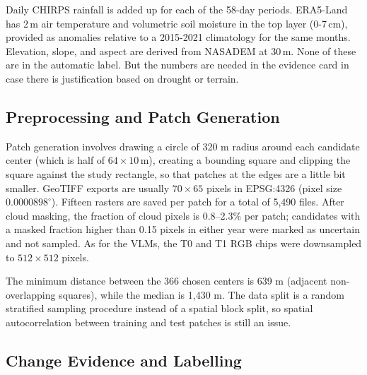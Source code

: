 Daily CHIRPS rainfall is added up for each of the 58-day periods.
ERA5-Land has 2\,m air temperature and volumetric soil moisture in the
top layer (0-7\,cm), provided as anomalies relative to a 2015-2021
climatology for the same months. Elevation, slope, and aspect are derived from NASADEM at 30\,m. None
of these are in the automatic label. But the numbers are needed in
the evidence card in case there is justification based on drought or
terrain.

\subsection{Preprocessing and Patch Generation}

Patch generation involves drawing a circle of 320 m radius
around each candidate center (which is half of $64 \times 10$\,m),
creating a bounding square and clipping the square against the
study rectangle, so that patches at the edges are a little bit smaller.
GeoTIFF exports are usually $70 \times 65$ pixels in EPSG:4326 (pixel size $0.0000898^\circ$).
Fifteen rasters are saved per patch for a total of 5,490 files. After cloud masking, the fraction of cloud pixels is 0.8--2.3\%
per patch; candidates with a masked fraction higher than 0.15
pixels in either year were marked as uncertain and not sampled. As
for the VLMs, the T0 and T1 RGB chips were downsampled to
$512 \times 512$ pixels.

The minimum distance between the 366 chosen centers is 639 m
(adjacent non-overlapping squares), while the median is 1,430 m.
The data split is a random stratified sampling procedure instead of a
spatial block split, so spatial autocorrelation between training
and test patches is still an issue.

\subsection{Change Evidence and Labelling}

